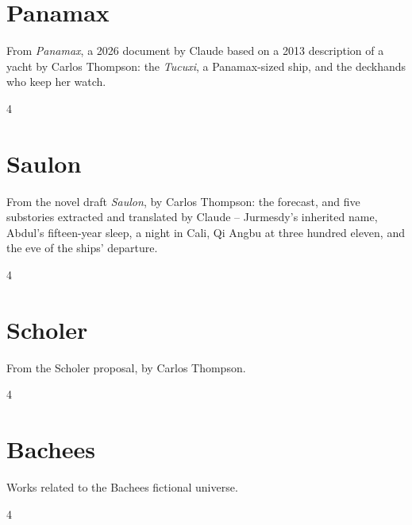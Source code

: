 \documentclass[a4paper,landscape]{memoir}
\begin{document}
\chapter{Panamax}
From \emph{Panamax}, a 2026 document by Claude based on a 2013 description of a yacht by Carlos Thompson: the \emph{Tucuxi}, a Panamax-sized ship, and the deckhands who keep her watch.
\clearpage\begin{multicols*}{4}



\end{multicols*}

\chapter{Saulon}
From the novel draft \emph{Saulon}, by Carlos Thompson: the forecast, and five substories extracted and translated by Claude -- Jurmesdy's inherited name, Abdul's fifteen-year sleep, a night in Cali, Qi Angbu at three hundred eleven, and the eve of the ships' departure.
\clearpage\begin{multicols*}{4}






\end{multicols*}

\chapter{Scholer}
From the Scholer proposal, by Carlos Thompson.
\clearpage\begin{multicols*}{4}




\end{multicols*}

\chapter{Bachees}
Works related to the Bachees fictional universe.
\clearpage\begin{multicols*}{4}


\end{multicols*}
\end{document}
